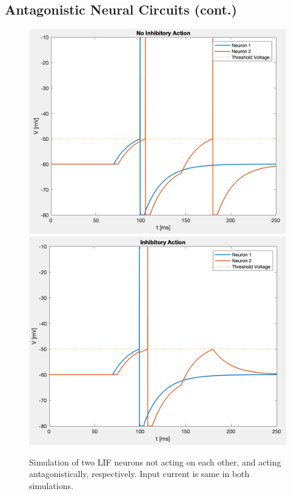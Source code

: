 \documentclass{article}
\begin{document}
\subsection{Antagonistic Neural Circuits (cont.)}
\begin{figure}
\center
\includegraphics[scale=0.29]{no_inhib.png}\hspace{1em}\includegraphics[scale=0.29]{inhib.png}
\caption{Simulation of two LIF neurons not acting on each other, and acting antagonistically, respectively. Input current is same in both simulations.}
\end{figure}
\end{document}
